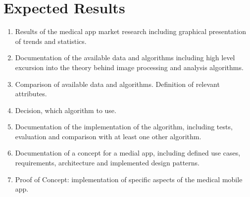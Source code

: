 \section{Expected Results}

\noindent
\begin{enumerate}
\item Results of the medical app market research including graphical presentation of trends and statistics.

\item Documentation of the available data and algorithms including high level excursion into the theory behind image processing and analysis algorithms.

\item Comparison of available data and algorithms. Definition of relevant attributes.

\item Decision, which algorithm to use.

\item Documentation of the implementation of the algorithm, including tests, evaluation and comparison with at least one other algorithm.

\item Documentation of a concept for a medial app, including defined use cases, requirements, architecture and implemented design patterns.

\item  Proof of Concept: implementation of specific aspects of the medical mobile app.

\end{enumerate}